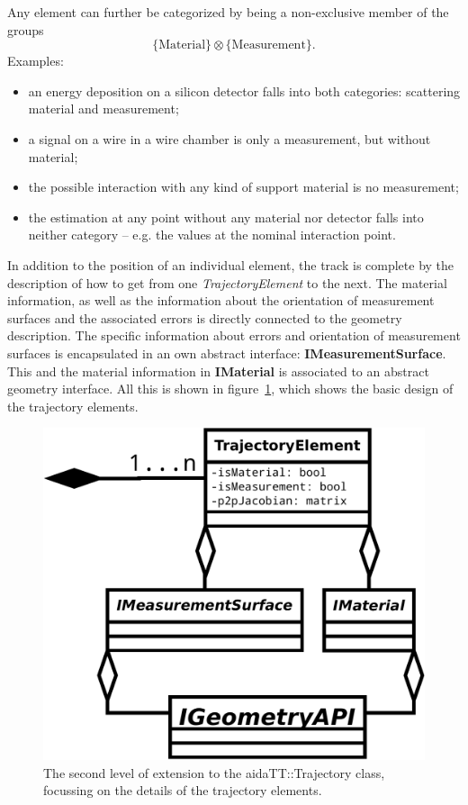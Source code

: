 \documentclass[12pt]{article}
\begin{document}
Any element can further be categorized by being a non-exclusive member of the groups 
$$ \{\mathrm{Material}\} \otimes \{\mathrm{Measurement}\}.$$
Examples: 
\begin{itemize}
    \item an energy deposition on a silicon detector falls into both categories: scattering material and measurement;
    \item a signal on a wire in a wire chamber is only a measurement, but without material;
    \item the possible interaction with any kind of support material is no measurement;
    \item the estimation at any point without any material nor detector falls into neither category -- e.g. the values at the nominal interaction point.
\end{itemize}
In addition to the position of an individual element, the track is complete by the description of how to get from one {\em TrajectoryElement} to the next.
The material information, as well as the information about the orientation of measurement surfaces and the associated errors is directly connected to the geometry description.
The specific information about errors and orientation of measurement surfaces is encapsulated in an own abstract interface: {\bf IMeasurementSurface}.
This and the material information in {\bf IMaterial} is associated to an abstract geometry interface.
All this is shown in figure~\ref{fig:te}, which shows the basic design of the trajectory elements.
 \begin{figure}[h!]
 \begin{center}
 \includegraphics[width=.5\linewidth]{trajectory_element.pdf}
 \end{center}
 \caption{The second level of extension to the aidaTT::Trajectory class, focussing on the details of the trajectory elements.}
 \label{fig:te}
 \end{figure}
\end{document}
